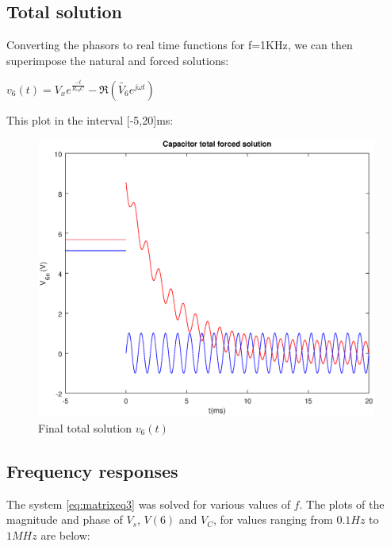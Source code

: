   

\subsection{Total solution}

Converting the phasors to real time functions for f=1KHz, we can then superimpose the natural and forced solutions:

$v_6(t)=V_xe^{\frac{-t}{R_{eq}C}}-\Re(\tilde{V_6}e^{j\omega t})$


  This plot in the interval [-5,20]ms:

  \begin{figure}[H] \centering
    \includegraphics[width=1\linewidth]{forced.eps}
    \caption{Final total solution $v_{6}(t)$}
    \label{fig:total}
    \end{figure}
    
\subsection{Frequency responses}
      
The system \ref{eq:matrixeq3} was solved for various values of $f$.
The plots of the magnitude and phase of $V_s$, $V(6)$ and $V_C$, for
values ranging from $0.1 Hz$ to $1 MHz$ are below:

